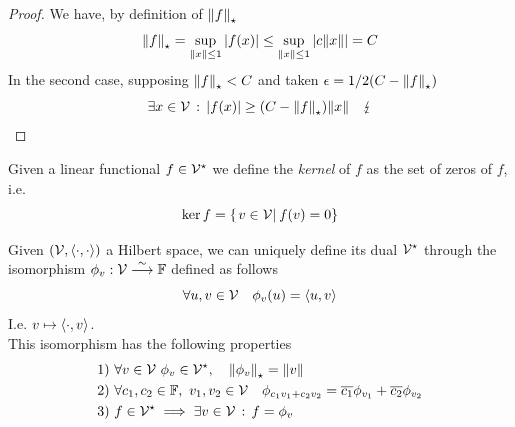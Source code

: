 \documentclass[../complete.tex]{subfiles}
\begin{document}
\begin{proof}
	We have, by definition of $\dnorm{f}$
	\begin{equation*}
		\dnorm{f}=\sup_{\norm{x}\le1}\abs{f(x)}\le\sup_{\norm{x}\le1}\abs{c\norm{x}}=C
	\end{equation*}
	In the second case, supposing $\dnorm{f}<C$ and taken $\epsilon=1/2(C-\dnorm{f})$
	\begin{equation*}
		\exists x\in\V\st\abs{f(x)}\ge(C-\dnorm{f})\norm{x}\quad\lightning
	\end{equation*}
\end{proof}
\begin{dfn}[Kernel]
	Given a linear functional $f\in\V^\star$ we define the \textit{kernel} of $f$ as the set of zeros of $f$, i.e.
	\begin{equation}
		\ker f=\left\{ \derin{v\in\V}f(v)=0 \right\}
		\label{eq:kernel}
	\end{equation}
\end{dfn}
\begin{thm}
	Given $(\V,\sprd)$ a Hilbert space, we can uniquely define its dual $\V^\star$ through the isomorphism $\phi_v:\V\fto[\sim]\F$ defined as follows
	\begin{equation*}
		\forall u,v\in\V\quad\phi_v(u)=\spr{u}{v}
	\end{equation*}
	I.e. $v\mapsto\spr{\cdot}{v}$.\\
	This isomorphism has the following properties
	\begin{equation}
		\begin{aligned}
			1)&\ \forall v\in\V\ \phi_v\in\V^\star,\quad\dnorm{\phi_v}=\norm{v}\\
			2)&\ \forall c_1,c_2\in\F,\ v_1,v_2\in\V\quad\phi_{c_1v_1+c_2v_2}=\cc{c_1}\phi_{v_1}+\cc{c_2}\phi_{v_2}\\
			3)&\ f\in\V^\star\implies{}\exists v\in\V\st f=\phi_v
		\end{aligned}
		\label{eq:rieszthm}
	\end{equation}
\end{thm}
\end{document}

